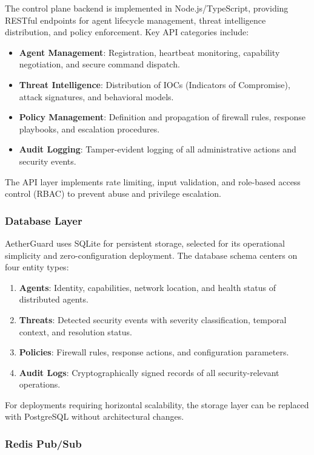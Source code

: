 The control plane backend is implemented in Node.js/TypeScript, providing RESTful endpoints for agent lifecycle management, threat intelligence distribution, and policy enforcement. Key API categories include:

\begin{itemize}
    \item \textbf{Agent Management}: Registration, heartbeat monitoring, capability negotiation, and secure command dispatch.
    \item \textbf{Threat Intelligence}: Distribution of IOCs (Indicators of Compromise), attack signatures, and behavioral models.
    \item \textbf{Policy Management}: Definition and propagation of firewall rules, response playbooks, and escalation procedures.
    \item \textbf{Audit Logging}: Tamper-evident logging of all administrative actions and security events.
\end{itemize}

The API layer implements rate limiting, input validation, and role-based access control (RBAC) to prevent abuse and privilege escalation.

\subsubsection{Database Layer}

AetherGuard uses SQLite for persistent storage, selected for its operational simplicity and zero-configuration deployment. The database schema centers on four entity types:

\begin{enumerate}
    \item \textbf{Agents}: Identity, capabilities, network location, and health status of distributed agents.
    \item \textbf{Threats}: Detected security events with severity classification, temporal context, and resolution status.
    \item \textbf{Policies}: Firewall rules, response actions, and configuration parameters.
    \item \textbf{Audit Logs}: Cryptographically signed records of all security-relevant operations.
\end{enumerate}

For deployments requiring horizontal scalability, the storage layer can be replaced with PostgreSQL without architectural changes.

\subsubsection{Redis Pub/Sub}

